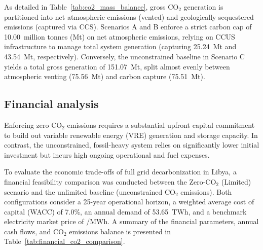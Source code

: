\documentclass[preprint,12pt]{elsarticle}
\begin{document}
As detailed in Table~\ref{tab:co2_mass_balance}, gross $\text{CO}_2$ generation is partitioned into net atmospheric emissions (vented) and geologically sequestered emissions (captured via CCS). Scenarios A and B enforce a strict carbon cap of 10.00~million tonnes (Mt) on net atmospheric emissions, relying on CCUS infrastructure to manage total system generation (capturing 25.24~Mt and 43.54~Mt, respectively). Conversely, the unconstrained baseline in Scenario C yields a total gross generation of 151.07~Mt, split almost evenly between atmospheric venting (75.56~Mt) and carbon capture (75.51~Mt).

\subsection{Financial analysis}
Enforcing zero $\text{CO}_2$ emissions requires a substantial upfront capital commitment to build out variable renewable energy (VRE) generation and storage capacity. In contrast, the unconstrained, fossil-heavy system relies on significantly lower initial investment but incurs high ongoing operational and fuel expenses. 

To evaluate the economic trade-offs of full grid decarbonization in Libya, a financial feasibility comparison was conducted between the {Zero-$\text{CO}_2$ (Limited)} scenario and the unlimited baseline (unconstrained $\text{CO}_2$ emissions). Both configurations consider a 25-year operational horizon, a weighted average cost of capital (WACC) of 7.0\%, an annual demand of 53.65~TWh, and a benchmark electricity market price of /MWh. A summary of the financial parameters, annual cash flows, and $\text{CO}_2$ emissions balance is presented in Table~\ref{tab:financial_co2_comparison}.
\end{document}
